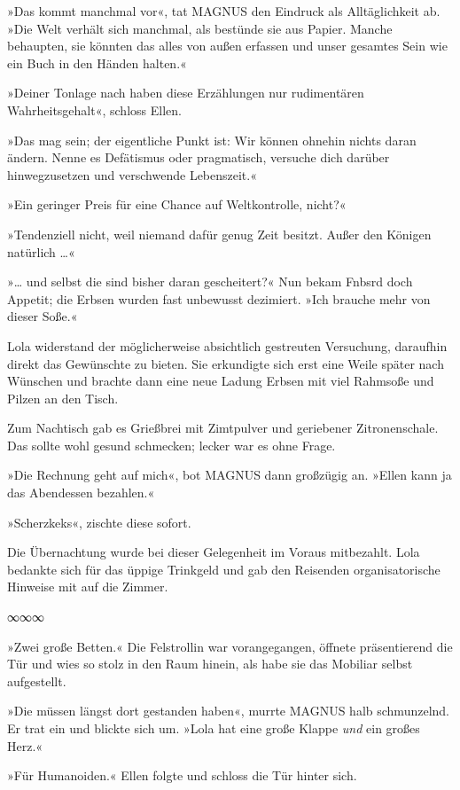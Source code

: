 »Das kommt manchmal vor«, tat MAGNUS den Eindruck als Alltäglichkeit ab. »Die Welt verhält sich manchmal, als bestünde sie aus Papier. Manche behaupten, sie könnten das alles von außen erfassen und unser gesamtes Sein wie ein Buch in den Händen halten.«

»Deiner Tonlage nach haben diese Erzählungen nur rudimentären Wahrheitsgehalt«, schloss Ellen.

»Das mag sein; der eigentliche Punkt ist: Wir können ohnehin nichts daran ändern. Nenne es Defätismus oder pragmatisch, versuche dich darüber hinwegzusetzen und verschwende Lebenszeit.«

»Ein geringer Preis für eine Chance auf Weltkontrolle, nicht?«

»Tendenziell nicht, weil niemand dafür genug Zeit besitzt. Außer den Königen natürlich …«

»… und selbst die sind bisher daran gescheitert?« Nun bekam Fnbsrd doch Appetit; die Erbsen wurden fast unbewusst dezimiert. »Ich brauche mehr von dieser Soße.«

Lola widerstand der möglicherweise absichtlich gestreuten Versuchung, daraufhin direkt das Gewünschte zu bieten. Sie erkundigte sich erst eine Weile später nach Wünschen und brachte dann eine neue Ladung Erbsen mit viel Rahmsoße und Pilzen an den Tisch.

Zum Nachtisch gab es Grießbrei mit Zimtpulver und geriebener Zitronenschale. Das sollte wohl gesund schmecken; lecker war es ohne Frage.

»Die Rechnung geht auf mich«, bot MAGNUS dann großzügig an. »Ellen kann ja das Abendessen bezahlen.«

»Scherzkeks«, zischte diese sofort.

Die Übernachtung wurde bei dieser Gelegenheit im Voraus mitbezahlt. Lola bedankte sich für das üppige Trinkgeld und gab den Reisenden organisatorische Hinweise mit auf die Zimmer.

\begin{center}
∞∞∞
\end{center}

»Zwei große Betten.« Die Felstrollin war vorangegangen, öffnete präsentierend die Tür und wies so stolz in den Raum hinein, als habe sie das Mobiliar selbst aufgestellt.

»Die müssen längst dort gestanden haben«, murrte MAGNUS halb schmunzelnd. Er trat ein und blickte sich um. »Lola hat eine große Klappe \emph{und} ein großes Herz.«

»Für Humanoiden.« Ellen folgte und schloss die Tür hinter sich.


